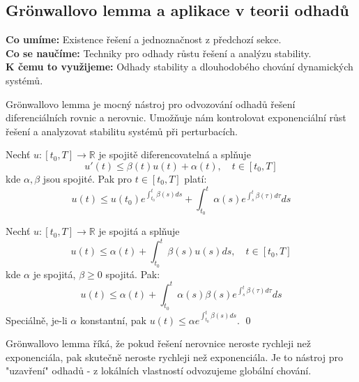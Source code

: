 \spc

\subsection{Grönwallovo lemma a aplikace v teorii odhadů}

\begin{scaffold}
\textbf{Co umíme:} Existence řešení a jednoznačnost z předchozí sekce. \\
\textbf{Co se naučíme:} Techniky pro odhady růstu řešení a analýzu stability. \\
\textbf{K čemu to využijeme:} Odhady stability a dlouhodobého chování dynamických systémů.
\end{scaffold}

\begin{motivation}
Grönwallovo lemma je mocný nástroj pro odvozování odhadů řešení diferenciálních rovnic a nerovnic. Umožňuje nám kontrolovat exponenciální růst řešení a analyzovat stabilitu systémů při perturbacích.
\end{motivation}

\begin{theorem}
Nechť $u: [t_0, T] \to \mathbb{R}$ je spojitě diferencovatelná a splňuje
\[
u'(t) \leq \beta(t)u(t) + \alpha(t), \quad t \in [t_0, T]
\]
kde $\alpha, \beta$ jsou spojité. Pak pro $t \in [t_0, T]$ platí:
\[
u(t) \leq u(t_0)e^{\int_{t_0}^t \beta(s)ds} + \int_{t_0}^t \alpha(s)e^{\int_s^t \beta(\tau)d\tau}ds
\]
\end{theorem}

\begin{theorem}
Nechť $u: [t_0, T] \to \mathbb{R}$ je spojitá a splňuje
\[
u(t) \leq \alpha(t) + \int_{t_0}^t \beta(s)u(s)ds, \quad t \in [t_0, T]
\]
kde $\alpha$ je spojitá, $\beta \geq 0$ spojitá. Pak:
\[
u(t) \leq \alpha(t) + \int_{t_0}^t \alpha(s)\beta(s)e^{\int_s^t \beta(\tau)d\tau}ds
\]
Speciálně, je-li $\alpha$ konstantní, pak $u(t) \leq \alpha e^{\int_{t_0}^t \beta(s)ds}$.
\qed
\end{theorem}

\begin{intuition}
Grönwallovo lemma říká, že pokud řešení nerovnice neroste rychleji než exponenciála, pak skutečně neroste rychleji než exponenciála. Je to nástroj pro "uzavření" odhadů - z lokálních vlastností odvozujeme globální chování.
\end{intuition}

